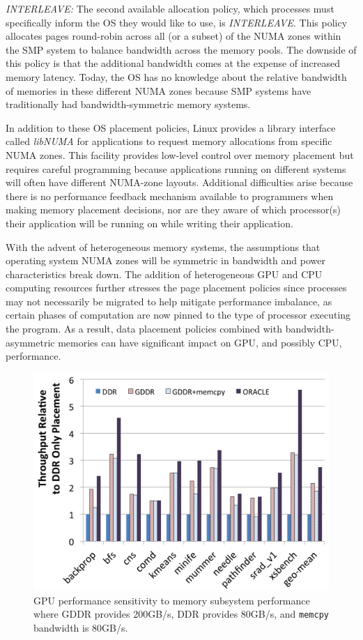 \emph{INTERLEAVE:} The second available allocation policy, which processes must
specifically inform the OS they would like to use, is \emph{INTERLEAVE}\@. This
policy allocates pages round-robin across all (or a subset) of the NUMA zones
within the SMP system to balance bandwidth across the memory pools.  The
downside of this policy is that the additional bandwidth comes at the expense of
increased memory latency. Today, the OS has no knowledge about the relative
bandwidth of memories in these different NUMA zones because SMP systems have
traditionally had bandwidth-symmetric memory systems.

In addition to these OS placement policies, Linux provides a library interface
called \textit{libNUMA} for applications to request memory allocations from
specific NUMA zones.  This facility provides low-level control over memory
placement but requires careful programming because applications running on
different systems will often have different NUMA-zone layouts.  Additional
difficulties arise because there is no performance feedback mechanism available
to programmers when making memory placement decisions, nor are they aware of
which processor(s) their application will be running on while writing their
application.

With the advent of heterogeneous memory systems, the assumptions that operating
system NUMA zones will be symmetric in bandwidth and power
characteristics break down.  The addition of heterogeneous GPU and CPU computing
resources further stresses the page placement policies since processes may not
necessarily be migrated to help mitigate performance imbalance, as certain
phases of computation are now pinned to the type of processor executing the
program.  As a result, data placement policies combined with
bandwidth-asymmetric memories can have significant impact on GPU, and possibly
CPU, performance.

\begin{figure}[t]
    \centering
    \includegraphics[width=0.7\columnwidth]{hpca2015/figures/motivation.png}
    \caption{GPU performance sensitivity to memory subsystem performance where GDDR provides 
    200GB/s, DDR provides 80GB/s, and {\tt memcpy} bandwidth is 80GB/s.}
    \label{fig:motivation-hpca2015}
\end{figure}

